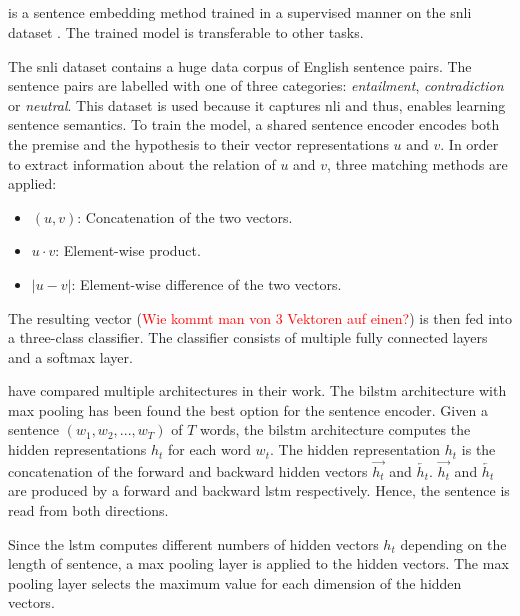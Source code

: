 \subsection{\infersent{}}\label{subsec:inferSent}

\infersent{} is a sentence embedding method trained in a supervised manner on the \ac{snli} dataset \cite{inferSent2018}.
The trained model is transferable to other tasks.

The \ac{snli} dataset contains a huge data corpus of English sentence pairs.
The sentence pairs are labelled with one of three categories: \textit{entailment}, \textit{contradiction} or \textit{neutral}.
This dataset is used because it captures \ac{nli} and thus, enables learning sentence semantics.
To train the model, a shared sentence encoder encodes both the premise and the hypothesis to their vector representations $u$ and $v$.
In order to extract information about the relation of $u$ and $v$, three matching methods are applied:

\begin{itemize}
    \item $(u,v)$: Concatenation of the two vectors.
    \item $u \cdot v$: Element-wise product.
    \item $|u - v|$: Element-wise difference of the two vectors.
\end{itemize}

The resulting vector (\textcolor{red}{Wie kommt man von 3 Vektoren auf einen?}) is then fed into a three-class classifier.
The classifier consists of multiple fully connected layers and a softmax layer.

\citeauthor{inferSent2018} have compared multiple architectures in their work.
The \ac{bilstm} architecture with max pooling has been found the best option for the sentence encoder.
Given a sentence $(w_1, w_2, ..., w_T)$ of $T$ words, the \ac{bilstm} architecture computes the hidden representations $h_t$ for each word $w_t$.
The hidden representation $h_t$ is the concatenation of the forward and backward hidden vectors $\overrightarrow{h_t}$ and $\overleftarrow{h_t}$.
$\overrightarrow{h_t}$ and $\overleftarrow{h_t}$ are produced by a forward and backward \ac{lstm} respectively.
Hence, the sentence is read from both directions.

Since the \ac{lstm} computes different numbers of hidden vectors $h_t$ depending on the length of sentence, a max pooling layer is applied to the hidden vectors.
The max pooling layer selects the maximum value for each dimension of the hidden vectors.






